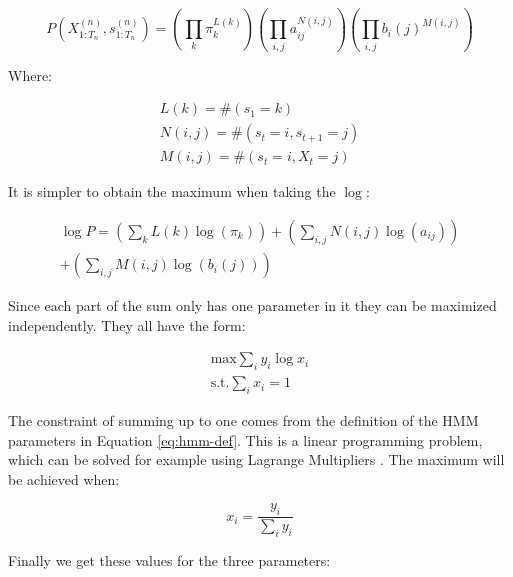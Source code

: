 \begin{equation}
  P(X_{1: T_{n}}^{(n)}, s_{1: T_{n}}^{(n)})=\left(\prod_{k} \pi_{k}^{L(k)}\right)\left(\prod_{i, j} a_{i j}^{N(i, j)}\right)\left(\prod_{i, j} b_{i}(j)^{M(i, j)}\right) 
\end{equation}

Where:

\begin{equation}
  \begin{array}{c}
L(k)=\#\left(s_{1}=k\right) \\
N(i, j)=\#\left(s_{t}=i, s_{t+1}=j\right) \\
M(i, j)=\#\left(s_{t}=i, X_{t}=j\right)
\end{array} 
\end{equation}

It is simpler to obtain the maximum when taking the $\log$:

\begin{equation}
\begin{split}
  \log P=\left(\sum_{k} L(k) \log \left(\pi_{k}\right)\right)+\left(\sum_{i, j} N(i, j) \log \left(a_{i j}\right)\right)  \\
   +\left(\sum_{i, j} M(i, j) \log \left(b_{i}(j)\right)\right) 
\end{split}
\end{equation}

Since each part of the sum only has one parameter in it they can be maximized independently. They all have the form: 

\begin{equation}
   \begin{aligned}
\text{max} \sum_{i} y_{i} \log x_{i} \\
\text{s.t.} \sum_{i} x_{i}=1
   \end{aligned}
  \label{eq:lp-statement}
\end{equation}

The constraint of summing up to one comes from the definition of the HMM parameters in Equation \eqref{eq:hmm-def}. This is a linear programming problem, which can be solved for example using Lagrange Multipliers \parencite{huang2001spoken}. The maximum will be achieved when: 

\begin{equation}
  x_{i}=\frac{y_{i}}{\sum_{i} y_{i}} 
  \label{eq:lp-solution}
\end{equation}

Finally we get these values for the three parameters: 

